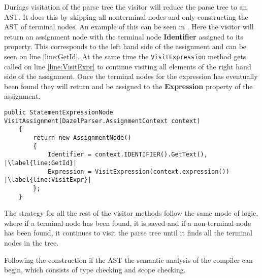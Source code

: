 Durings visitation of the parse tree the visitor will reduce the parse tree to an AST. It does this by skipping all nonterminal nodes and only constructing the AST of terminal nodes. An example of this can be seen in . 
Here the visitor will return an assignment node with the terminal node \textbf{Identifier} assigned to its property. This corresponds to the left hand side of the assignment and can be seen on line \ref{line:GetId}. At the same time the \texttt{VisitExpression} method gets called on line \ref{line:VisitExpr} to continue visiting all elements of the right hand side of the assignment. Once the terminal nodes for the expression has eventually been found they will return and be assigned to the \textbf{Expression} property of the assignment.

\begin{lstlisting}[caption={Visit assignment}, label={lst:VisitAssignment},escapechar=|]
    public StatementExpressionNode VisitAssignment(DazelParser.AssignmentContext context)
    {
        return new AssignmentNode()
        {
            Identifier = context.IDENTIFIER().GetText(), |\label{line:GetId}|
            Expression = VisitExpression(context.expression()) |\label{line:VisitExpr}|
        };
    }
\end{lstlisting}

The strategy for all the rest of the visitor methods follow the same mode of logic, where if a terminal node has been found, it is saved and if a non terminal node has been found, it continues to visit the parse tree until it finds all the terminal nodes in the tree.

Following the construction if the AST the semantic analysis of the compiler can begin, which consists of type checking and scope checking.
